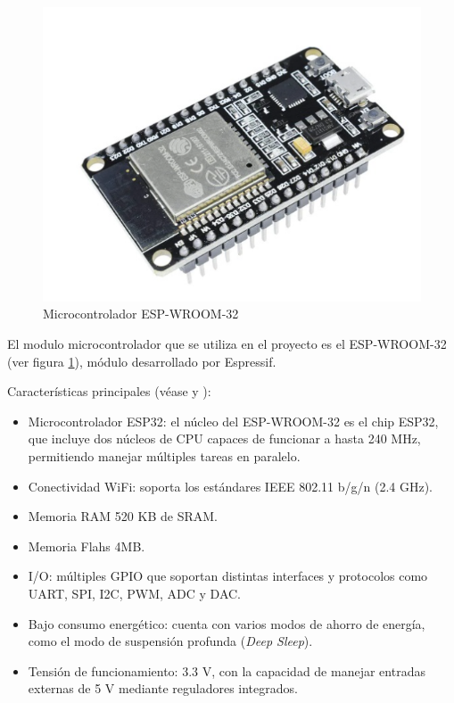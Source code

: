 \label{sec:Microcontrolador}
\begin{figure}[H]
	\centering
	\includegraphics[scale=1]{./Figures/Hardware/Modulos/esp32.png}
	\caption{Microcontrolador ESP-WROOM-32}
	\label{fig:Microcontrolador}
\end{figure}

El modulo microcontrolador que se utiliza en el proyecto es el ESP-WROOM-32 (ver figura \ref{fig:Microcontrolador}), módulo desarrollado por Espressif.

Características principales (véase \cite{Esp32Datasheet} y \cite{Esp32WroomDatasheet}):
\begin{itemize}
    \item Microcontrolador ESP32: el núcleo del ESP-WROOM-32 es el chip ESP32, que incluye dos núcleos de CPU capaces de funcionar a hasta 240 MHz, permitiendo manejar múltiples tareas en paralelo.
    \item Conectividad WiFi: soporta los estándares IEEE 802.11 b/g/n (2.4 GHz).
    \item Memoria RAM 520 KB de SRAM.
    \item Memoria Flahs 4MB.
    \item I/O: múltiples GPIO que soportan distintas interfaces y protocolos como UART, SPI, I2C, PWM, ADC y DAC.
    \item Bajo consumo energético: cuenta con varios modos de ahorro de energía, como el modo de suspensión profunda (\textit{Deep Sleep}).
    \item Tensión de funcionamiento: 3.3 V, con la capacidad de manejar entradas externas de 5 V mediante reguladores integrados.
\end{itemize}

